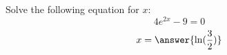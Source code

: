 \documentclass{ximera}
\author{David Kish}
\begin{document}
\begin{exercise}
Solve the following equation for $x$:
\[
4e^{2x}-9=0
\]
\[
x=\answer{\ln(\frac{3}{2})}
\]
\end{exercise}
\end{document}
